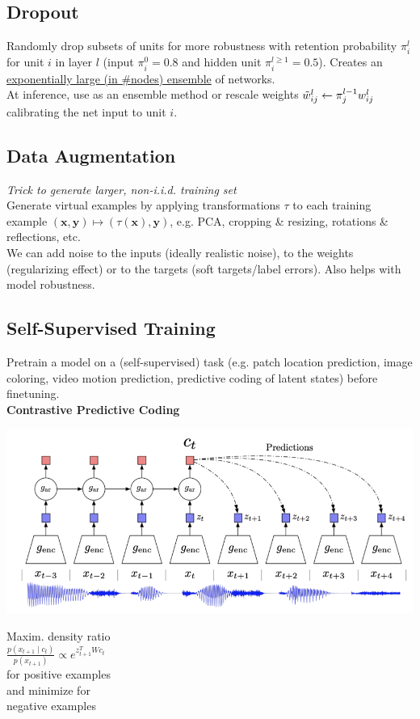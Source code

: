 \subsection*{Dropout}
Randomly drop subsets of units for more robustness with retention probability $\pi_i^l$ for unit $i$ in layer $l$ (input $\pi_i^0=0.8$ and hidden unit $\pi_i^{l\geq 1}=0.5$). Creates an 
\underline{exponentially large (in \#nodes) ensemble} of networks.\\[5pt]
At inference, use as an ensemble method or rescale weights $\Tilde{w}_{ij}^l\leftarrow\pi_j^{l-1}w_{ij}^l$ calibrating the net input to unit $i$.
\subsection*{Data Augmentation}
\textit{Trick to generate larger, non-i.i.d. training set}\\[5pt]
Generate virtual examples by applying transformations $\tau$ to each training example $(\mathbf{x},\mathbf{y})\mapsto (\tau(\mathbf{x}),\mathbf{y})$, e.g. 
PCA, cropping \& resizing, rotations \& reflections, etc.\\[5pt]
We can add noise to the inputs (ideally realistic noise), to the weights (regularizing effect) or to the targets (soft targets/label errors). Also helps with model robustness. 
\subsection*{Self-Supervised Training}
Pretrain a model on a (self-supervised) task (e.g. patch location prediction, image coloring, video motion prediction, predictive coding of latent states) before finetuning.\\[5pt]
\textbf{Contrastive Predictive Coding}

\begin{minipage}{.6\linewidth}
    \includegraphics[width=\linewidth]{contrastive_predictive_coding.png}
\end{minipage}
\begin{minipage}{.4\linewidth}
    Maxim. density ratio\\
    $\frac{p(x_{t+1}\mid c_t)}{p(x_{t+1})} \propto e^{z_{t+1}^TWc_t}$\\
    for positive examples\\ and minimize for\\
    negative examples
\end{minipage}

